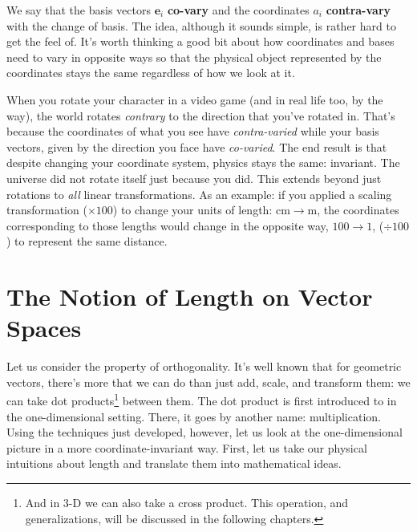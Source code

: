 \documentclass[../master.tex]{subfiles}
\begin{document}
	We say that the basis vectors $\mathbf e_i$ \textbf{co-vary} and the coordinates $a_i$ \textbf{contra-vary} with the change of basis. The idea, although it sounds simple, is rather hard to get the feel of. It's worth thinking a good bit about how coordinates and bases need to vary in opposite ways so that the physical object represented by the coordinates stays the same regardless of how we look at it. 
	
	
	 When you rotate your character in a video game (and in real life too, by the way), the world rotates \emph{contrary} to the direction that you've rotated in. That's because the coordinates of what you see have \emph{contra-varied} while your basis vectors, given by the direction you face have \emph{co-varied}. The end result is that despite changing your coordinate system, physics stays the same: invariant. The universe did not rotate itself just because you did. This extends beyond just rotations to \emph{all} linear transformations. As an example: if you applied a scaling transformation ($\times 100$) to change your units of length: $\mathrm {cm} \to \mathrm m$, the coordinates corresponding to those lengths would change in the opposite way, $100 \to 1$, ($\div 100$) to represent the same distance. \\
	
	
	\section{The Notion of Length on Vector Spaces} %
	\label{sec:the_notion_of_length_on_vector_spaces}
	
	Let us consider the property of orthogonality. It's well known that for geometric vectors, there's more that we can do than just add, scale, and transform them: we can take dot products\footnote{And in 3-D we can also take a cross product. This operation, and generalizations, will be discussed in the following chapters.} between them. 
	The dot product is first introduced to in the one-dimensional setting. There, it goes by another name: multiplication. Using the techniques just developed, however, let us look at the one-dimensional picture in a more coordinate-invariant way. First, let us take our physical intuitions about length and translate them into mathematical ideas.
	
\end{document}
